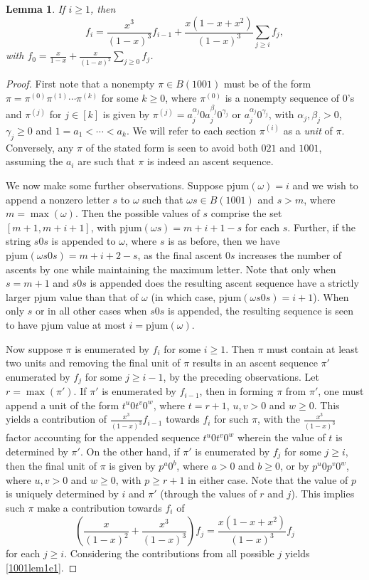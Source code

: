 \documentclass{article}
\theoremstyle{remark}
\theoremstyle{plain}
\newtheorem{lemma}[theorem]{Lemma}
\begin{document}
\begin{lemma}\label{1001lem1}
If $i \geq 1$, then
\begin{equation}\label{1001lem1e1}
f_i=\frac{x^3}{(1-x)^3}f_{i-1}+\frac{x(1-x+x^2)}{(1-x)^3}\sum_{j\geq i}f_j,
\end{equation}
with $f_0=\frac{x}{1-x}+\frac{x}{(1-x)^2}\sum_{j\geq0}f_j$.
\end{lemma}
\begin{proof}
First note that a nonempty $\pi \in B(1001)$ must be of the form $\pi=\pi^{(0)}\pi^{(1)}\cdots \pi^{(k)}$ for some $k \geq 0$, where $\pi^{(0)}$ is a nonempty sequence of $0$'s and $\pi^{(j)}$ for  $j \in [k]$ is given by $\pi^{(j)}=a_j^{\alpha_j}0a_j^{\beta_j}0^{\gamma_j}$ or $a_j^{\alpha_j}0^{\gamma_j}$, with $\alpha_j,\beta_j>0$, $\gamma_j \geq0$ and $1=a_1<\cdots<a_k$.  We will refer to each section $\pi^{(i)}$ as a \emph{unit} of $\pi$.  Conversely, any $\pi$ of the stated form is seen to avoid both $021$ and $1001$, assuming the $a_i$ are such that $\pi$ is indeed an ascent sequence.

We now make some further observations.  Suppose $\text{pjum}(\omega)=i$ and we wish to append a nonzero letter $s$ to $\omega$ such that $\omega s \in B(1001)$ and $s>m$, where $m=\max(\omega)$.  Then the possible values of $s$ comprise the set $[m+1,m+i+1]$, with $\text{pjum}(\omega s)=m+i+1-s$ for each $s$. Further, if the string $s0s$ is appended to $\omega$, where $s$ is as before, then we have $\text{pjum}(\omega s0s)=m+i+2-s$, as the final ascent $0s$ increases the number of ascents by one while maintaining the maximum letter. Note that only when $s=m+1$ and $s0s$ is appended does the resulting ascent sequence have a strictly larger $\text{pjum}$ value than that of $\omega$ (in which case, $\text{pjum}(\omega s0s)=i+1$).  When only $s$ or in all other cases when $s0s$ is appended, the resulting sequence is seen to have pjum value at most $i=\text{pjum}(\omega)$.

Now suppose $\pi$ is enumerated by $f_i$ for some $i \geq1$.  Then $\pi$ must contain at least two units and removing the final unit of $\pi$ results in an ascent sequence $\pi'$ enumerated by $f_j$ for some $j \geq i-1$, by the preceding observations.  Let $r=\max(\pi')$.  If $\pi'$ is enumerated by $f_{i-1}$, then in forming $\pi$ from $\pi'$, one must append a unit of the form $t^u0t^v0^w$, where $t=r+1$, $u,v>0$ and $w \geq0$.  This yields a contribution of $\frac{x^3}{(1-x)^3}f_{i-1}$ towards $f_i$ for such $\pi$, with the $\frac{x^3}{(1-x)^3}$ factor accounting for the appended sequence $t^u0t^v0^w$ wherein the value of $t$ is determined by $\pi'$.  On the other hand, if $\pi'$ is enumerated by $f_j$ for some $j \geq i$, then the final unit of $\pi$ is given by $p^a0^b$, where $a>0$ and $b \geq0$, or by $p^u0p^v0^w$, where $u,v>0$ and $w \geq0$, with $p \geq r+1$ in either case.  Note that the value of $p$ is uniquely determined by $i$ and $\pi'$ (through the values of $r$ and $j$).    This implies such $\pi$ make a contribution towards $f_i$ of
$$\left(\frac{x}{(1-x)^2}+\frac{x^3}{(1-x)^3}\right)f_j=\frac{x(1-x+x^2)}{(1-x)^3}f_j$$
for each $j \geq i$.  Considering the contributions from all possible $j$ yields \eqref{1001lem1e1}.


\end{proof}
\end{document}
